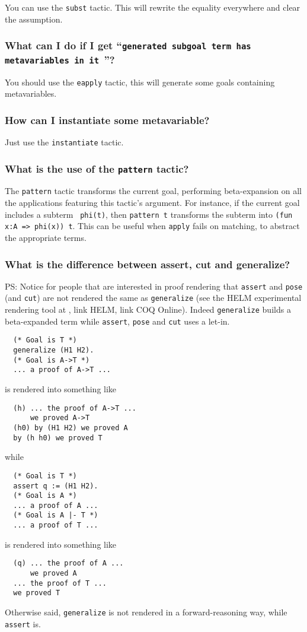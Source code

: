 \documentclass[a4paper,pdftex]{article}
\def\Question#1{\stepcounter{question}\subsubsection{#1}}
\def\apply{{\tt apply}}
\def\cut{{\tt cut}}
\def\assert{{\tt assert}}
\def\generalize{{\tt generalize}}
\def\eapply{{\tt eapply}}
\def\pose{{\tt pose}}
\def\subst{{\tt subst}}
\def\instantiate{{\tt instantiate}}
\def\pattern{{\tt pattern}}
\begin{document}
You can use the {\subst} tactic. This will rewrite the equality everywhere and clear the assumption.

\Question{What can I do if I get ``{\tt generated subgoal term has metavariables in it }''?}

You should use the {\eapply} tactic, this will generate some goals containing metavariables. 

\Question{How can I instantiate some metavariable?}

Just use the {\instantiate} tactic.


\Question{What is the use of the {\pattern} tactic?}

The {\pattern} tactic transforms the current goal, performing
beta-expansion on all the applications featuring this tactic's
argument. For instance, if the current goal includes a subterm {\tt
phi(t)}, then {\tt pattern t} transforms the subterm into {\tt (fun
x:A => phi(x)) t}. This can be useful when {\apply} fails on matching,
to abstract the appropriate terms.

\Question{What is the difference between assert, cut and generalize?}

PS: Notice for people that are interested in proof rendering that \assert
and {\pose} (and \cut) are not rendered the same as {\generalize} (see the
HELM experimental rendering tool at , link
HELM, link COQ Online). Indeed {\generalize} builds a beta-expanded term
while \assert, {\pose} and {\cut} uses a let-in.

\begin{verbatim}
  (* Goal is T *)
  generalize (H1 H2).
  (* Goal is A->T *)
  ... a proof of A->T ...
\end{verbatim}

is rendered into something like
\begin{verbatim}
  (h) ... the proof of A->T ...
      we proved A->T
  (h0) by (H1 H2) we proved A
  by (h h0) we proved T
\end{verbatim}
while 
\begin{verbatim}
  (* Goal is T *)
  assert q := (H1 H2).
  (* Goal is A *)
  ... a proof of A ...
  (* Goal is A |- T *)
  ... a proof of T ...
\end{verbatim}
is rendered into something like
\begin{verbatim}
  (q) ... the proof of A ...
      we proved A
  ... the proof of T ...
  we proved T
\end{verbatim}
Otherwise said, {\generalize} is not rendered in a forward-reasoning way,
while {\assert} is.
\end{document}
